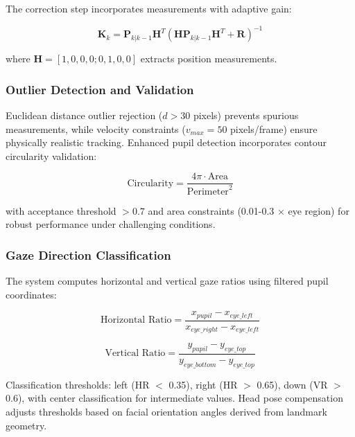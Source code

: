 \documentclass[conference]{IEEEtran}
\begin{document}
The correction step incorporates measurements with adaptive gain:

\begin{equation}
\mathbf{K}_k = \mathbf{P}_{k|k-1}\mathbf{H}^T(\mathbf{H}\mathbf{P}_{k|k-1}\mathbf{H}^T + \mathbf{R})^{-1}
\end{equation}

where $\mathbf{H} = [1, 0, 0, 0; 0, 1, 0, 0]$ extracts position measurements.

\subsubsection{Outlier Detection and Validation}

Euclidean distance outlier rejection ($d > 30$ pixels) prevents spurious measurements, while velocity constraints ($v_{max} = 50$ pixels/frame) ensure physically realistic tracking. Enhanced pupil detection incorporates contour circularity validation:

\begin{equation}
\text{Circularity} = \frac{4\pi \cdot \text{Area}}{\text{Perimeter}^2}
\end{equation}

with acceptance threshold $> 0.7$ and area constraints (0.01-0.3 × eye region) for robust performance under challenging conditions\cite{li2003survey}.

\subsubsection{Gaze Direction Classification}

The system computes horizontal and vertical gaze ratios using filtered pupil coordinates:

\begin{equation}
\text{Horizontal Ratio} = \frac{x_{pupil} - x_{eye\_left}}{x_{eye\_right} - x_{eye\_left}}
\end{equation}

\begin{equation}
\text{Vertical Ratio} = \frac{y_{pupil} - y_{eye\_top}}{y_{eye\_bottom} - y_{eye\_top}}
\end{equation}

Classification thresholds: left (HR $<$ 0.35), right (HR $>$ 0.65), down (VR $>$ 0.6), with center classification for intermediate values. Head pose compensation adjusts thresholds based on facial orientation angles derived from landmark geometry\cite{bar2001estimation}.
\end{document}

